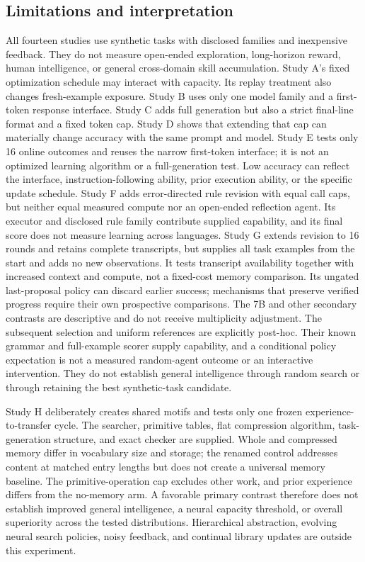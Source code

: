 \documentclass[11pt]{article}
\begin{document}
\subsection{Limitations and interpretation}
All fourteen studies use synthetic tasks with disclosed families and inexpensive
feedback. They do not measure open-ended exploration, long-horizon reward,
human intelligence, or general cross-domain skill accumulation. Study A's
fixed optimization schedule may interact with capacity. Its replay treatment
also changes fresh-example exposure. Study B uses only one model family and
a first-token response interface. Study C adds full generation but also a
strict final-line format and a fixed token cap. Study D shows that extending that cap can materially
change accuracy with the same prompt and model. Study E tests only 16 online
outcomes and reuses the narrow first-token interface; it is not an optimized
learning algorithm or a full-generation test. Low accuracy can reflect the
interface, instruction-following ability, prior execution ability, or the
specific update schedule. Study F adds error-directed rule revision with
equal call caps, but neither equal measured compute nor an open-ended
reflection agent. Its executor and disclosed rule family contribute supplied
capability, and its final score does not measure learning across languages.
Study G extends revision to 16 rounds and retains complete transcripts,
but supplies all task examples from the start and adds no new observations.
It tests transcript availability together with increased context and compute,
not a fixed-cost memory comparison. Its ungated last-proposal policy can
discard earlier success; mechanisms that preserve verified progress require
their own prospective comparisons. The 7B and other secondary contrasts are
descriptive and do not receive multiplicity adjustment.
The subsequent selection and uniform references are explicitly post-hoc.
Their known grammar and full-example scorer supply capability, and a
conditional policy expectation is not a measured random-agent outcome or
an interactive intervention. They do not establish general intelligence
through random search or through retaining the best synthetic-task candidate.

Study H deliberately creates shared motifs and tests only one frozen
experience-to-transfer cycle. The searcher, primitive tables, flat compression
algorithm, task-generation structure, and exact checker are supplied. Whole
and compressed memory differ in vocabulary size and storage; the renamed
control addresses content at matched entry lengths but does not create a
universal memory baseline. The primitive-operation cap excludes other work,
and prior experience differs from the no-memory arm. A favorable primary
contrast therefore does not establish improved general intelligence, a neural
capacity threshold, or overall superiority across the tested distributions.
Hierarchical abstraction, evolving neural search policies, noisy feedback,
and continual library updates are outside this experiment.
\end{document}
